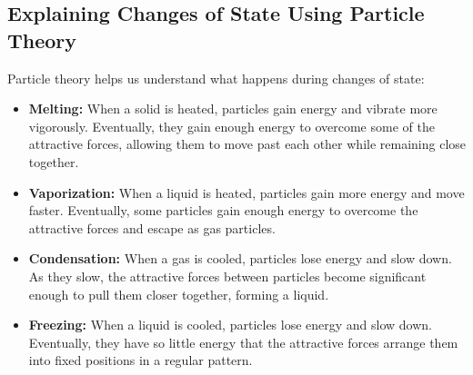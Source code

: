 

\subsection{Explaining Changes of State Using Particle Theory}

Particle theory helps us understand what happens during changes of state:

\begin{itemize}
    \item \textbf{Melting:} When a solid is heated, particles gain energy and vibrate more vigorously. Eventually, they gain enough energy to overcome some of the attractive forces, allowing them to move past each other while remaining close together.
    
    \item \textbf{Vaporization:} When a liquid is heated, particles gain more energy and move faster. Eventually, some particles gain enough energy to overcome the attractive forces and escape as gas particles.
    
    \item \textbf{Condensation:} When a gas is cooled, particles lose energy and slow down. As they slow, the attractive forces between particles become significant enough to pull them closer together, forming a liquid.
    
    \item \textbf{Freezing:} When a liquid is cooled, particles lose energy and slow down. Eventually, they have so little energy that the attractive forces arrange them into fixed positions in a regular pattern.
\end{itemize}

